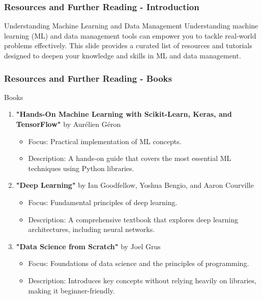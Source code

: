 \documentclass[aspectratio=169]{beamer}
\begin{document}
\begin{frame}[fragile]
    \frametitle{Resources and Further Reading - Introduction}
    \begin{block}{Understanding Machine Learning and Data Management}
        Understanding machine learning (ML) and data management tools can empower you to tackle real-world problems effectively. This slide provides a curated list of resources and tutorials designed to deepen your knowledge and skills in ML and data management.
    \end{block}
\end{frame}

\begin{frame}[fragile]
    \frametitle{Resources and Further Reading - Books}
    \begin{block}{Books}
        \begin{enumerate}
            \item \textbf{"Hands-On Machine Learning with Scikit-Learn, Keras, and TensorFlow"} by Aurélien Géron
                \begin{itemize}
                    \item Focus: Practical implementation of ML concepts.
                    \item Description: A hands-on guide that covers the most essential ML techniques using Python libraries.
                \end{itemize}
            \item \textbf{"Deep Learning"} by Ian Goodfellow, Yoshua Bengio, and Aaron Courville
                \begin{itemize}
                    \item Focus: Fundamental principles of deep learning.
                    \item Description: A comprehensive textbook that explores deep learning architectures, including neural networks.
                \end{itemize}
            \item \textbf{"Data Science from Scratch"} by Joel Grus
                \begin{itemize}
                    \item Focus: Foundations of data science and the principles of programming.
                    \item Description: Introduces key concepts without relying heavily on libraries, making it beginner-friendly.
                \end{itemize}
        \end{enumerate}
    \end{block}
\end{frame}
\end{document}
